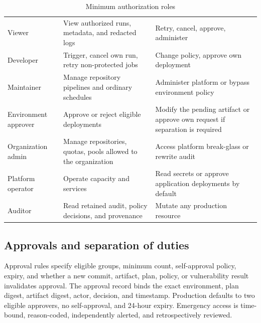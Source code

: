 \begin{table}[htbp]
\centering
\caption{Minimum authorization roles}
\label{tab:roles}
\begin{tabularx}{\textwidth}{@{}L{0.22\textwidth}Y Y@{}}
  \toprule
   &  &  \\
  \midrule
  Viewer & View authorized runs, metadata, and redacted logs & Retry, cancel, approve, administer \\
  Developer & Trigger, cancel own run, retry non-protected jobs & Change policy, approve own deployment \\
  Maintainer & Manage repository pipelines and ordinary schedules & Administer platform or bypass environment policy \\
  Environment approver & Approve or reject eligible deployments & Modify the pending artifact or approve own request if separation is required \\
  Organization admin & Manage repositories, quotas, pools allowed to the organization & Access platform break-glass or rewrite audit \\
  Platform operator & Operate capacity and services & Read secrets or approve application deployments by default \\
  Auditor & Read retained audit, policy decisions, and provenance & Mutate any production resource \\
  \bottomrule
\end{tabularx}
\end{table}

\subsection{Approvals and separation of duties}

Approval rules specify eligible groups, minimum count, self-approval policy, expiry,
and whether a new commit, artifact, plan, policy, or vulnerability result invalidates
approval. The approval record binds the exact environment, plan digest, artifact
digest, actor, decision, and timestamp. Production defaults to two eligible approvers,
no self-approval, and 24-hour expiry. Emergency access is time-bound, reason-coded,
independently alerted, and retrospectively reviewed.

